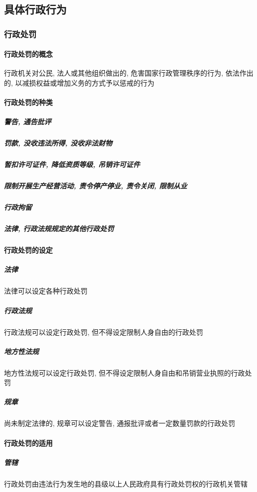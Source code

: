 \subsection{具体行政行为}

\subsubsection{行政处罚}

\paragraph{行政处罚的概念} 行政机关对公民, 法人或其他组织做出的, 危害国家行政管理秩序的行为, 依法作出的, 以减损权益或增加义务的方式予以惩戒的行为

\paragraph{行政处罚的种类}

\subparagraph{警告, 通告批评}

\subparagraph{罚款, 没收违法所得, 没收非法财物}

\subparagraph{暂扣许可证件, 降低资质等级, 吊销许可证件}

\subparagraph{限制开展生产经营活动, 责令停产停业, 责令关闭, 限制从业}

\subparagraph{行政拘留}

\subparagraph{法律, 行政法规规定的其他行政处罚}

\paragraph{行政处罚的设定}

\subparagraph{法律} 法律可以设定各种行政处罚

\subparagraph{行政法规} 行政法规可以设定行政处罚, 但不得设定限制人身自由的行政处罚

\subparagraph{地方性法规} 地方性法规可以设定行政处罚, 但不得设定限制人身自由和吊销营业执照的行政处罚

\subparagraph{规章} 尚未制定法律的, 规章可以设定警告, 通报批评或者一定数量罚款的行政处罚

\paragraph{行政处罚的适用}

\subparagraph{管辖} 行政处罚由违法行为发生地的县级以上人民政府具有行政处罚权的行政机关管辖

